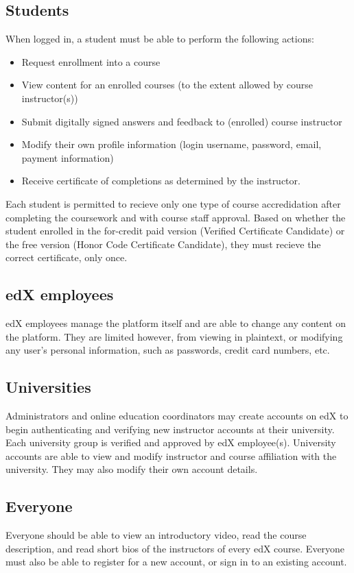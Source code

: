 \documentclass[11pt]{article}
\begin{document}
\subsection{Students}
When logged in, a student must be able to perform the following actions:
\begin{itemize}
\item Request enrollment into a course
\item View content for an enrolled courses (to the extent allowed by course instructor(s))
\item Submit digitally signed answers and feedback to (enrolled) course instructor
\item Modify their own profile information (login username, password, email, payment information)
\item Receive certificate of completions as determined by the instructor.
\end{itemize}

Each student is permitted to recieve only one type of course accredidation after completing the coursework and with course staff approval. Based on whether the student enrolled in the for-credit paid version (Verified Certificate Candidate) or the free version (Honor Code Certificate Candidate), they must recieve the correct certificate, only once.\\

\subsection{edX employees}
edX employees manage the platform itself and are able to change any content on the platform. They are limited however, from viewing in plaintext, or modifying any user's personal information, such as passwords, credit card numbers, etc.\\

\subsection{Universities}
Administrators and online education coordinators may create accounts on edX to begin authenticating and verifying new instructor accounts at their university. Each university group is verified and approved by edX employee(s). University accounts are able to view and modify instructor and course affiliation with the university. They may also modify their own account details.\\

\subsection{Everyone}
Everyone should be able to view an introductory video, read the course description, and read short bios of the instructors of every edX course. Everyone must also be able to register for a new account, or sign in to an existing account.
\end{document}
